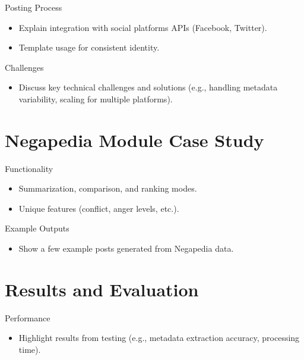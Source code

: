 \documentclass{beamer}
\begin{document}
    \begin{frame}{Posting Process}
        \begin{itemize}
            \item Explain integration with social platforms APIs (Facebook, Twitter).
            \item Template usage for consistent identity.
        \end{itemize}
    \end{frame}

    \begin{frame}{Challenges}
        \begin{itemize}
            \item Discuss key technical challenges and solutions (e.g., handling metadata variability, scaling for multiple platforms).
        \end{itemize}
    \end{frame}


\section{Negapedia Module Case Study}
    \begin{frame}{Functionality}
        \begin{itemize}
            \item Summarization, comparison, and ranking modes.
            \item Unique features (conflict, anger levels, etc.).
        \end{itemize}
    \end{frame}

    \begin{frame}{Example Outputs}
        \begin{itemize}
            \item Show a few example posts generated from Negapedia data.
        \end{itemize}
    \end{frame}


\section{Results and Evaluation}
    \begin{frame}{Performance}
        \begin{itemize}
            \item Highlight results from testing (e.g., metadata extraction accuracy, processing time).
        \end{itemize}
    \end{frame}
\end{document}
